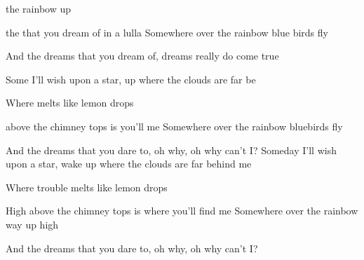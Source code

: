 

\zs

  the rainbow  up

 the  that you dream of  in a lulla  
\ks
\zs
Somewhere over the rainbow blue birds fly

And the dreams that you dream of, dreams really do come true
\ks
\zr

Some I'll wish upon a star,  up where the clouds are far be

Where melts like lemon drops

 above the chimney tops is  you'll me
\kr
\zs
Somewhere over the rainbow bluebirds fly

And the dreams that you dare to, oh why, oh why can't I?
\ks
\zr
Someday I'll wish upon a star, wake up where the clouds are far behind me

Where trouble melts like lemon drops

High above the chimney tops is where you'll find me
\kr
\zs
Somewhere over the rainbow way up high

And the dreams that you dare to, oh why, oh why can't I?
\ks

\kp



